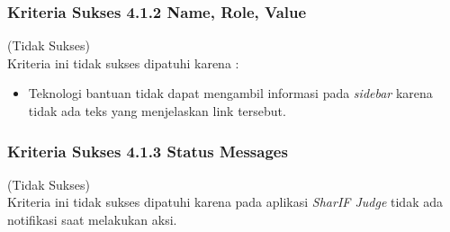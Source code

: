 \subsubsection{Kriteria Sukses 4.1.2 Name, Role, Value}
\label{subsubsec:kepatuhan_kriteria_4.1.2}
(Tidak Sukses) \\

Kriteria ini tidak sukses dipatuhi karena : 
\begin{itemize}
	\item Teknologi bantuan tidak dapat mengambil informasi pada \textit{sidebar} karena tidak ada teks yang menjelaskan link tersebut.
\end{itemize}

\subsubsection{Kriteria Sukses 4.1.3 Status Messages}
\label{subsubsec:kepatuhan_kriteria_4.1.3}
(Tidak Sukses) \\

Kriteria ini tidak sukses dipatuhi karena pada aplikasi \textit{SharIF Judge} tidak ada notifikasi saat melakukan aksi.